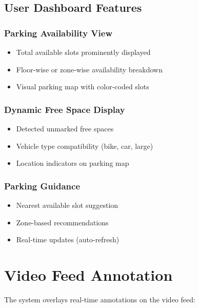 \documentclass[12pt,a4paper]{report}
\begin{document}
\subsection{User Dashboard Features}

\subsubsection{Parking Availability View}
\begin{itemize}
    \item Total available slots prominently displayed
    \item Floor-wise or zone-wise availability breakdown
    \item Visual parking map with color-coded slots
\end{itemize}

\subsubsection{Dynamic Free Space Display}
\begin{itemize}
    \item Detected unmarked free spaces
    \item Vehicle type compatibility (bike, car, large)
    \item Location indicators on parking map
\end{itemize}

\subsubsection{Parking Guidance}
\begin{itemize}
    \item Nearest available slot suggestion
    \item Zone-based recommendations
    \item Real-time updates (auto-refresh)
\end{itemize}


\section{Video Feed Annotation}

The system overlays real-time annotations on the video feed:
\end{document}
